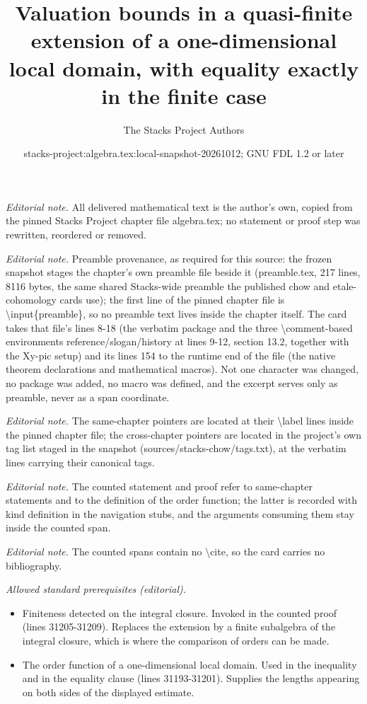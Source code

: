 \documentclass[10pt,a4paper]{amsart}
\title{Valuation bounds in a quasi-finite extension of a one-dimensional local domain, with equality exactly in the finite case}
\author{The Stacks Project Authors}
\date{stacks-project:algebra.tex:local-snapshot-20261012; GNU FDL 1.2 or later}
\theoremstyle{plain}
\theoremstyle{definition}
\theoremstyle{remark}
\numberwithin{equation}{subsection}
\begin{document}
\maketitle
\noindent\textit{Editorial note.} All delivered mathematical text is the author's own, copied from the pinned Stacks Project chapter file algebra.tex; no statement or proof step was rewritten, reordered or removed.\par\medskip
\noindent\textit{Editorial note.} Preamble provenance, as required for this source: the frozen snapshot stages the chapter's own preamble file beside it (preamble.tex, 217 lines, 8116 bytes, the same shared Stacks-wide preamble the published chow and etale-cohomology cards use); the first line of the pinned chapter file is \textbackslash{}input\{preamble\}, so no preamble text lives inside the chapter itself. The card takes that file's lines 8-18 (the verbatim package and the three \textbackslash{}comment-based environments reference/slogan/history at lines 9-12, section 13.2, together with the Xy-pic setup) and its lines 154 to the runtime end of the file (the native theorem declarations and mathematical macros). Not one character was changed, no package was added, no macro was defined, and the excerpt serves only as preamble, never as a span coordinate.\par\medskip
\noindent\textit{Editorial note.} The same-chapter pointers are located at their \textbackslash{}label lines inside the pinned chapter file; the cross-chapter pointers are located in the project's own tag list staged in the snapshot (sources/stacks-chow/tags.txt), at the verbatim lines carrying their canonical tags.\par\medskip
\noindent\textit{Editorial note.} The counted statement and proof refer to same-chapter statements and to the definition of the order function; the latter is recorded with kind definition in the navigation stubs, and the arguments consuming them stay inside the counted span.\par\medskip
\noindent\textit{Editorial note.} The counted spans contain no \textbackslash{}cite, so the card carries no bibliography.\par\medskip
\noindent\textit{Allowed standard prerequisites (editorial).}\begin{itemize}
\item Finiteness detected on the integral closure. Invoked in the counted proof (lines 31205-31209). Replaces the extension by a finite subalgebra of the integral closure, which is where the comparison of orders can be made.
\item The order function of a one-dimensional local domain. Used in the inequality and in the equality clause (lines 31193-31201). Supplies the lengths appearing on both sides of the displayed estimate.
\end{itemize}\medskip
\end{document}
